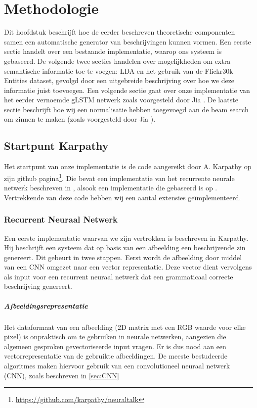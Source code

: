 \chapter{Methodologie}
Dit hoofdstuk beschrijft hoe de eerder beschreven theoretische componenten samen een automatische generator van beschrijvingen kunnen vormen. Een eerste sectie handelt over een bestaande implementatie, waarop ons systeem is gebaseerd. De volgende twee secties handelen over mogelijkheden om extra semantische informatie toe te voegen: LDA en het gebruik van de Flickr30k Entities dataset, gevolgd door een uitgebreide beschrijving over hoe we deze informatie juist toevoegen. Een volgende sectie gaat over onze implementatie van het eerder vernoemde gLSTM netwerk zoals voorgesteld door Jia . De laatste sectie beschrijft hoe wij een normalisatie hebben toegevoegd aan de beam search om zinnen te maken (zoals voorgesteld door Jia ).

\section{Startpunt Karpathy} 
Het startpunt van onze implementatie is de code aangereikt door A. Karpathy op zijn github pagina\footnote{\url{https://github.com/karpathy/neuraltalk}}. Die bevat een implementatie van het recurrente neurale netwerk beschreven in , alsook een implementatie die gebaseerd is op . Vertrekkende van deze code hebben wij een aantal extensies ge\"implementeerd.
\subsection{Recurrent Neuraal Netwerk}
Een eerste implementatie waarvan we zijn vertrokken is beschreven in Karpathy. Hij beschrijft een systeem dat op basis van een afbeelding een beschrijvende zin genereert. Dit gebeurt in twee stappen. Eerst wordt de afbeelding door middel van een CNN omgezet naar een vector representatie. Deze vector dient vervolgens als input voor een recurrent neuraal netwerk dat een grammaticaal correcte beschrijving genereert.

\paragraph{Afbeeldingsrepresentatie}
Het dataformaat van een afbeelding (2D matrix met een RGB waarde voor elke pixel) is onpraktisch om te gebruiken in neurale netwerken, aangezien die algemeen gesproken gevectoriseerde input vragen. Er is dus nood aan een vectorrepresentatie van de gebruikte afbeeldingen. De meeste bestudeerde algoritmes maken hiervoor gebruik van een convolutioneel neuraal netwerk (CNN), zoals beschreven in \ref{sec:CNN}

